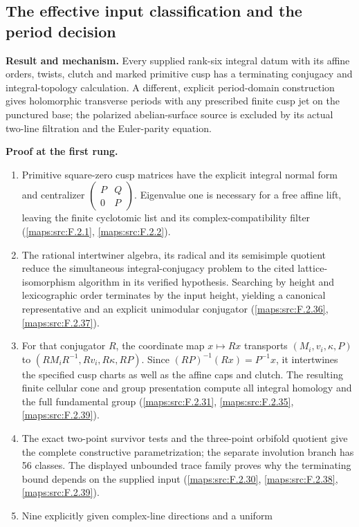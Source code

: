 \documentclass[11pt,a4paper]{article}
\theoremstyle{definition}
\newcommand{\RungZero}[1]{\par\noindent\textbf{Result and mechanism.} #1\par\smallskip}
\newcommand{\RungOne}{\par\Needspace{6\baselineskip}\noindent\textbf{Proof at the first rung.}\par\nobreak\smallskip}
\begin{document}
\subsection{The effective input classification and the period decision}
\RungZero{Every supplied rank-six integral datum with its affine
orders, twists, clutch and marked primitive cusp has a terminating
conjugacy and integral-topology calculation.  A different, explicit
period-domain construction gives holomorphic transverse periods with
any prescribed finite cusp jet on the punctured base; the polarized
abelian-surface source is excluded by its actual two-line filtration
and the Euler-parity equation.}
\RungOne
\begin{enumerate}[label=\arabic*.]
\item Primitive square-zero cusp matrices have the explicit integral
  normal form and centralizer
  $\left(\begin{smallmatrix}P&Q\\0&P\end{smallmatrix}\right)$.
  Eigenvalue one is necessary for a free affine lift, leaving the
  finite cyclotomic list and its complex-compatibility filter
  (\cref{maps:src:F.2.1}, \cref{maps:src:F.2.2}).
\item The rational intertwiner algebra, its radical and its
  semisimple quotient reduce the simultaneous integral-conjugacy
  problem to the cited lattice-isomorphism algorithm in its verified
  hypothesis.  Searching by height and lexicographic order terminates
  by the input height, yielding a canonical representative and an
  explicit unimodular conjugator (\cref{maps:src:F.2.36}, \cref{maps:src:F.2.37}).
\item For that conjugator $R$, the coordinate map $x\mapsto Rx$
  transports $(M_i,v_i,\kappa,P)$ to
  $(RM_iR^{-1},Rv_i,R\kappa,RP)$.  Since
  $(RP)^{-1}(Rx)=P^{-1}x$, it intertwines the specified cusp charts
  as well as the affine caps and clutch.  The resulting finite
  cellular cone and group presentation compute all integral homology
  and the full fundamental group (\cref{maps:src:F.2.31}, \cref{maps:src:F.2.35}, \cref{maps:src:F.2.39}).
\item The exact two-point survivor tests and the three-point
  orbifold quotient give the complete constructive parametrization;
  the separate involution branch has 56 classes.  The displayed
  unbounded trace family proves why the terminating bound depends on
  the supplied input (\cref{maps:src:F.2.30}, \cref{maps:src:F.2.38}, \cref{maps:src:F.2.39}).
\item Nine explicitly given complex-line directions and a uniform

\end{enumerate}
\end{document}
